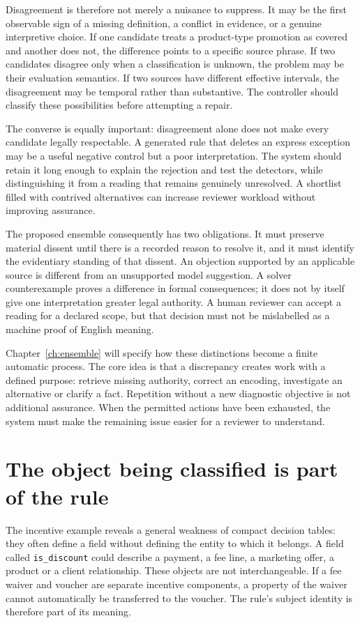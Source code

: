 Disagreement is therefore not merely a nuisance to suppress. It may be the first
observable sign of a missing definition, a conflict in evidence, or a genuine
interpretive choice. If one candidate treats a product-type promotion as covered
and another does not, the difference points to a specific source phrase. If two
candidates disagree only when a classification is unknown, the problem may be
their evaluation semantics. If two sources have different effective intervals,
the disagreement may be temporal rather than substantive. The controller should
classify these possibilities before attempting a repair.

The converse is equally important: disagreement alone does not make every
candidate legally respectable. A generated rule that deletes an express exception
may be a useful negative control but a poor interpretation. The system should
retain it long enough to explain the rejection and test the detectors, while
distinguishing it from a reading that remains genuinely unresolved. A shortlist
filled with contrived alternatives can increase reviewer workload without
improving assurance.

The proposed ensemble consequently has two obligations. It must preserve
material dissent until there is a recorded reason to resolve it, and it must
identify the evidentiary standing of that dissent. An objection supported by an
applicable source is different from an unsupported model suggestion. A solver
counterexample proves a difference in formal consequences; it does not by itself
give one interpretation greater legal authority. A human reviewer can accept a
reading for a declared scope, but that decision must not be mislabelled as a
machine proof of English meaning.

Chapter~\ref{ch:ensemble} will specify how these distinctions become a finite
automatic process. The core idea is that a discrepancy creates work with a
defined purpose: retrieve missing authority, correct an encoding, investigate an
alternative or clarify a fact. Repetition without a new diagnostic objective is
not additional assurance. When the permitted actions have been exhausted, the
system must make the remaining issue easier for a reviewer to understand.

\section{The object being classified is part of the rule}
\label{sec:problem-objects}
The incentive example reveals a general weakness of compact decision tables:
they often define a field without defining the entity to which it belongs. A
field called \texttt{is\_discount} could describe a payment, a fee line, a
marketing offer, a product or a client relationship. These objects are not
interchangeable. If a fee waiver and voucher are separate incentive components,
a property of the waiver cannot automatically be transferred to the voucher.
The rule's subject identity is therefore part of its meaning.

